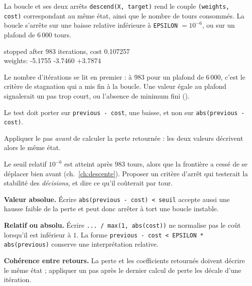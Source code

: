 \begin{tache}{La boucle et ses deux arrêts}
 \texttt{descend(X, target)} rend le couple
\texttt{(weights, cost)} correspondant au même état, ainsi que le nombre de tours
consommés. La boucle s'arrête sur une baisse relative inférieure à
\texttt{EPSILON} $=10^{-6}$, ou sur un plafond de $6\,000$ tours.

\begin{center}\ttfamily\footnotesize
stopped after 983 iterations, cost 0.107257\\
weights: -5.1755 -3.7460 +3.7874
\end{center}
Le nombre d'itérations se lit en premier : à $983$ pour un plafond de $6\,000$,
c'est le critère de stagnation qui a mis fin à la boucle. Une valeur égale au
plafond signalerait un pas trop court, ou l'absence de minimum fini
().

 Le test doit porter sur \texttt{previous - cost}, une baisse, et
non sur \texttt{abs(previous - cost)}.

 Appliquer le pas \emph{avant} de calculer la perte retournée :
les deux valeurs décrivent alors le même état.

 Le seuil relatif $10^{-6}$ est atteint après $983$ tours, alors
que la frontière a cessé de se déplacer bien avant (ch.~\ref{ch:descente}).
Proposer un critère d'arrêt qui testerait la stabilité des \emph{décisions}, et
dire ce qu'il coûterait par tour.
\end{tache}

\begin{vigilance}
\textbf{Valeur absolue.} Écrire \texttt{abs(previous - cost) < seuil} accepte
aussi une hausse faible de la perte et peut donc arrêter à tort une boucle
instable.

\textbf{Relatif ou absolu.} Écrire \texttt{... / max(1, abs(cost))} ne
normalise pas le coût lorsqu'il est inférieur à $1$. La forme
\texttt{previous - cost < EPSILON * abs(previous)} conserve une interprétation
relative.

\textbf{Cohérence entre retours.} La perte et les coefficients retournés
doivent décrire le même état ; appliquer un pas après le dernier calcul de perte
les décale d'une itération.
\end{vigilance}

